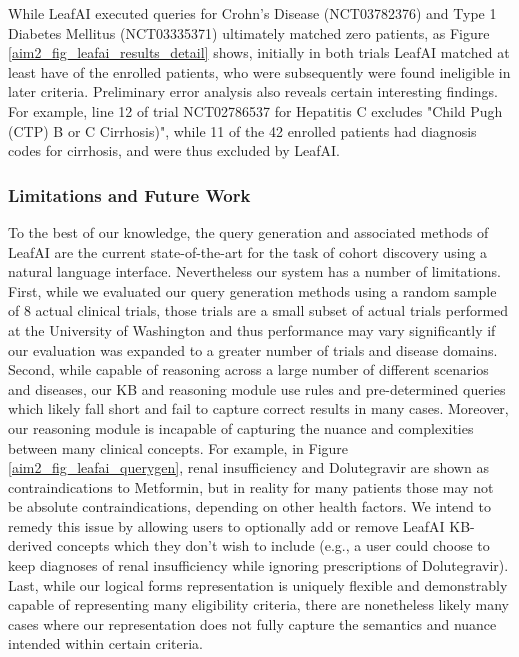 \documentclass[../main.tex]{subfiles}
\begin{document}
While LeafAI executed queries for Crohn's Disease (NCT03782376) and Type 1 Diabetes Mellitus (NCT03335371) ultimately matched zero patients, as Figure \ref{aim2_fig_leafai_results_detail} shows, initially in both trials LeafAI matched at least have of the enrolled patients, who were subsequently were found ineligible in later criteria. Preliminary error analysis also reveals certain interesting findings. For example, line 12 of trial NCT02786537 for Hepatitis C excludes "Child Pugh (CTP) B or C Cirrhosis)", while 11 of the 42 enrolled patients had diagnosis codes for cirrhosis, and were thus excluded by LeafAI.

\subsubsection{Limitations and Future Work}

To the best of our knowledge, the query generation and associated methods of LeafAI are the current state-of-the-art for the task of cohort discovery using a natural language interface. Nevertheless our system has a number of limitations. First, while we evaluated our query generation methods using a random sample of 8 actual clinical trials, those trials are a small subset of actual trials performed at the University of Washington and thus performance may vary significantly if our evaluation was expanded to a greater number of trials and disease domains. Second, while capable of reasoning across a large number of different scenarios and diseases, our KB and reasoning module use rules and pre-determined queries which likely fall short and fail to capture correct results in many cases. Moreover, our reasoning module is incapable of capturing the nuance and complexities between many clinical concepts. For example, in Figure \ref{aim2_fig_leafai_querygen}, renal insufficiency and Dolutegravir are shown as contraindications to Metformin, but in reality for many patients those may not be absolute contraindications, depending on other health factors. We intend to remedy this issue by allowing users to optionally add or remove LeafAI KB-derived concepts which they don't wish to include (e.g., a user could choose to keep diagnoses of renal insufficiency while ignoring prescriptions of Dolutegravir). Last, while our logical forms representation is uniquely flexible and demonstrably capable of representing many eligibility criteria, there are nonetheless likely many cases where our representation does not fully capture the semantics and nuance intended within certain criteria.
\end{document}
